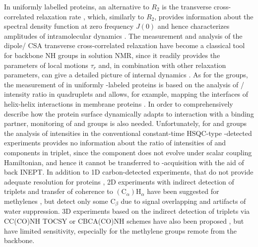 \documentclass[twocolumn]{svjour3}           %
\begin{document}
In uniformly labelled proteins, an alternative to $R_2$ is the transverse 
cross-correlated relaxation rate \gtwoXH, which, similarly to $R_2$, 
provides information about the spectral density function at zero frequency 
$J(0)$ and hence characterizes amplitudes of intramolecular dynamics 
\cite{yang_probing_2011}. The measurement and analysis of the 
di\-pole\slash{} CSA transverse cross-correlated relaxation \gtwoNNH{} 
have become a classical tool for backbone NH groups in solution {NMR}, 
since it readily provides the parameters of local motions $\tau_r$ 
\cite{chill_measurement_2006} and, in combination with other relaxation 
parameters, can give a detailed picture of internal dynamics 
\cite{cavanagh_protein_2007,charlier_protein_2016}. As for the \CHthree{} 
groups, the measurement of \gtwoCH{} in uniformly \nclab-labeled proteins 
is based on the analysis of \qinner\slash \qouter{} intensity ratio in 
\clab{} quadruplets \cite{zhang_probing_2006} and allows, for example, 
mapping the interfaces of helix-helix interactions in membrane proteins 
\cite{lesovoy_nmr_2017}. In order to comprehensively describe how the 
protein surface dynamically adapts to interaction with a binding 
partner, monitoring of \CHtwo{} and \NHtwo{} groups is also needed. 
Unfortunately, for \CHtwo{} and \NHtwo{} groups the analysis of 
intensities in the conventional constant-time {HSQC}-type \hlab-detected 
experiments \cite{zhang_probing_2006,lesovoy_nmr_2017} provides no 
information about the ratio of intensities of \qinner{} and \qouter{}
components in \CHtwo{} triplet, since the \qinner{} component 
\TermInner{}
does not evolve under \oneJch{} scalar coupling Hamiltonian, 
and hence it cannot be transferred to \hlab-acquisition with the aid 
of back {INEPT}. In addition to 1D carbon-detected experiments, that 
do not provide adequate resolution for proteins 
\cite{ghalebani_nmr_2008,kaderavek_spectral_2016}, 2D experiments with
indirect detection of \clab{} triplets and transfer of coherence to
$(\text{C}_\alpha) \text{H}_\alpha$ have been suggested for methylenes 
\cite{banci_side_2001}, but detect only some $\text{C}_\beta$ due to 
signal overlapping and artifacts of water suppression. 3D experiments 
based on the indirect detection of \clab{} triplets via CC(CO)NH {TOCSY} or CBCA(CO)NH schemes have also been proposed \cite{zheng_measurement_2004,yang_1h13c_1999},
but have limited sensitivity, especially for the methylene groups 
remote from the backbone. 
\end{document}

